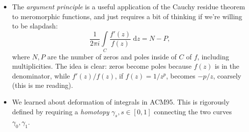 \documentclass[11pt,
        usenames, %
        dvipsnames %
    ]{report}
\begin{document}
\begin{itemize}
    \item The \emph{argument principle} is a useful application of the Cauchy
        residue theorem to meromorphic functions, and just requires a bit of
        thinking if we're willing to be slapdash:
        \begin{equation}
            \frac{1}{2\pi i}\int\limits_{C}
                \frac{f'(z)}{f(z)}\;\mathrm{d}z = N - P,
        \end{equation}
        where $N, P$ are the number of zeros and poles inside of $C$ of $f$,
        including multiplicities. The idea is clear: zeros become poles because
        $f(z)$ is in the denominator, while $f'(z) / f(z)$, if $f(z) = 1/z^p$,
        becomes $-p/z$, coarsely (this is me reading).

    \item We learned about deformation of integrals in ACM95. This is rigorously
        defined by requiring a \emph{homotopy} $\gamma_s, s \in [0, 1]$
        connecting the two curves $\gamma_0, \gamma_1$.
\end{itemize}
\end{document}
